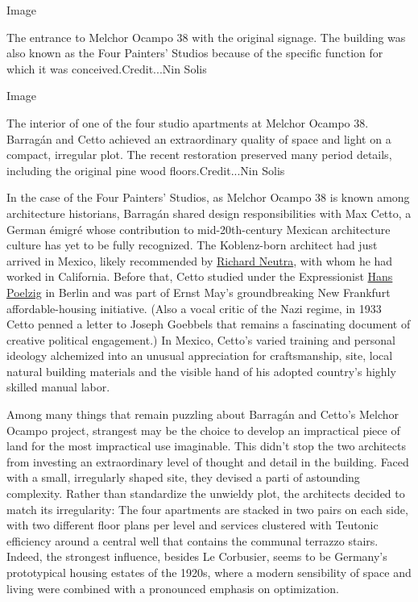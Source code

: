 Image

The entrance to Melchor Ocampo 38 with the original signage. The
building was also known as the Four Painters' Studios because of the
specific function for which it was conceived.Credit...Nin Solis

Image

The interior of one of the four studio apartments at Melchor Ocampo 38.
Barragán and Cetto achieved an extraordinary quality of space and light
on a compact, irregular plot. The recent restoration preserved many
period details, including the original pine wood floors.Credit...Nin
Solis

In the case of the Four Painters' Studios, as Melchor Ocampo 38 is known
among architecture historians, Barragán shared design responsibilities
with Max Cetto, a German émigré whose contribution to mid-20th-century
Mexican architecture culture has yet to be fully recognized. The
Koblenz-born architect had just arrived in Mexico, likely recommended by
\href{https://www.nytimes.com/1970/04/18/archives/richard-neutra-architect-dies-helped-shape-modern-outlook.html}{Richard
Neutra}, with whom he had worked in California. Before that, Cetto
studied under the Expressionist
\href{https://www.nytimes.com/1936/06/16/archives/hans-poelzig-dead-german-architect-placed-in-background-by-nazis.html}{Hans
Poelzig} in Berlin and was part of Ernst May's groundbreaking New
Frankfurt affordable-housing initiative. (Also a vocal critic of the
Nazi regime, in 1933 Cetto penned a letter to Joseph Goebbels that
remains a fascinating document of creative political engagement.) In
Mexico, Cetto's varied training and personal ideology alchemized into an
unusual appreciation for craftsmanship, site, local natural building
materials and the visible hand of his adopted country's highly skilled
manual labor.

Among many things that remain puzzling about Barragán and Cetto's
Melchor Ocampo project, strangest may be the choice to develop an
impractical piece of land for the most impractical use imaginable. This
didn't stop the two architects from investing an extraordinary level of
thought and detail in the building. Faced with a small, irregularly
shaped site, they devised a parti of astounding complexity. Rather than
standardize the unwieldy plot, the architects decided to match its
irregularity: The four apartments are stacked in two pairs on each side,
with two different floor plans per level and services clustered with
Teutonic efficiency around a central well that contains the communal
terrazzo stairs. Indeed, the strongest influence, besides Le Corbusier,
seems to be Germany's prototypical housing estates of the 1920s, where a
modern sensibility of space and living were combined with a pronounced
emphasis on optimization.


